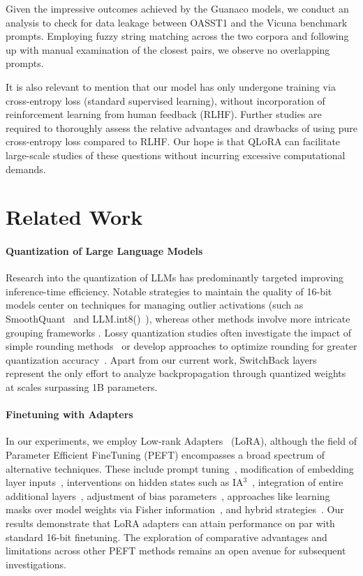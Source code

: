 Given the impressive outcomes achieved by the {Guanaco} models, we conduct an analysis to check for data leakage between OASST1 and the Vicuna benchmark prompts. Employing fuzzy string matching across the two corpora and following up with manual examination of the closest pairs, we observe no overlapping prompts.

It is also relevant to mention that our model has only undergone training via cross-entropy loss (standard supervised learning), without incorporation of reinforcement learning from human feedback (RLHF). Further studies are required to thoroughly assess the relative advantages and drawbacks of using pure cross-entropy loss compared to RLHF. Our hope is that \textsc{QLoRA} can facilitate large-scale studies of these questions without incurring excessive computational demands.

\section{Related Work}

\paragraph{Quantization of Large Language Models} Research into the quantization of LLMs has predominantly targeted improving inference-time efficiency. Notable strategies to maintain the quality of 16-bit models center on techniques for managing outlier activations (such as SmoothQuant~\citep{xiao2022smoothquant} and LLM.int8()~\citep{dettmers2022llm}), whereas other methods involve more intricate grouping frameworks \citep{park2022nuqmm, yao2022zeroquant}. Lossy quantization studies often investigate the impact of simple rounding methods~\citep{dettmers2022case,zeng2022glm,pope2022efficiently} or develop approaches to optimize rounding for greater quantization accuracy~\citep{frantar2022gptq}. Apart from our current work, SwitchBack layers~\citep{wortsman2023stable} represent the only effort to analyze backpropagation through quantized weights at scales surpassing 1B parameters.

\paragraph{Finetuning with Adapters} In our experiments, we employ Low-rank Adapters~\citep{hu2021lora} (LoRA), although the field of Parameter Efficient FineTuning (PEFT) encompasses a broad spectrum of alternative techniques. These include prompt tuning~\citep{qin2021learning,lester2021power,li2021prefix}, modification of embedding layer inputs~\citep{an2022input}, interventions on hidden states such as IA$^3$~\citep{liu2022few}, integration of entire additional layers~\citep{houlsby2019parameter}, adjustment of bias parameters~\citep{zaken2021bitfit}, approaches like learning masks over model weights via Fisher information~\citep{sung2021training}, and hybrid strategies~\citep{henderson2021compacter}. Our results demonstrate that LoRA adapters can attain performance on par with standard 16-bit finetuning. The exploration of comparative advantages and limitations across other PEFT methods remains an open avenue for subsequent investigations.


